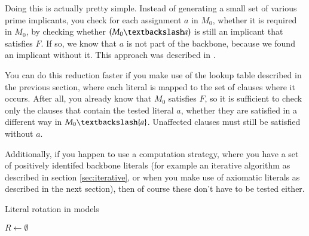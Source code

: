 Doing this is actually pretty simple. Instead of generating a small set of various prime implicants, you check for each assignment $a$ in $M_0$, whether it is required in $M_0$, by checking whether $(M_0 \textbackslash a)$ is still an implicant that satisfies $F$. If so, we know that $a$ is not part of the backbone, because we found an implicant without it. This approach was described in \cite{mjl15}.

You can do this reduction faster if you make use of the lookup table described in the previous section, where each literal is mapped to the set of clauses where it occurs. After all, you already know that $M_0$ satisfies $F$, so it is sufficient to check only the clauses that contain the tested literal $a$, whether they are satisfied in a different way in $M_0 \textbackslash \{a\}$. Unaffected clauses must still be satisfied without $a$.

Additionally, if you happen to use a computation strategy, where you have a set of positively identifed backbone literals (for example an iterative algorithm as described in section \ref{sec:iterative}, or when you make use of axiomatic literals as described in the next section), then of course these don't have to be tested either.



\begin{algorithm}
\caption{{\sc Literal rotation in models }}
\DontPrintSemicolon
{}
$R \gets \emptyset$\;
\;

\end{algorithm}

